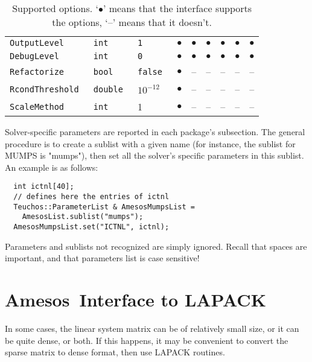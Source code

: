 \documentclass[11pt]{SANDreport}
\newcommand{\amesos}{{\sc Amesos}}
\begin{document}
\begin{sidewaystable}[tbhp]
\begin{tabular}{| p{5cm} | p{2cm} | p{2cm} | c | c | c
      | c | c | c |}
    \tt OutputLevel         & \tt int    & \tt 1      & $\bullet$ & $\bullet$ & $\bullet$ & $\bullet$ & $\bullet$  & $\bullet$\\
    \tt DebugLevel          & \tt int    & \tt 0      & $\bullet$ & $\bullet$ & $\bullet$ & $\bullet$ & $\bullet$ & $\bullet$ \\
    \tt Refactorize         & \tt bool   & \tt false  & $\bullet$ & -- & -- & -- & -- & -- \\
    \tt RcondThreshold      & \tt double & $10^{-12}$ & $\bullet$ & -- & -- & -- & -- &--\\
    \tt ScaleMethod         & \tt int    & 1          & $\bullet$ & -- & -- & -- & -- &--\\
    \hline
  \end{tabular}
  \caption{Supported options. `$\bullet$' means that the interface
    supports the options, `--' means that it doesn't.}
  \label{tab:options}
\end{sidewaystable}

Solver-specific parameters are reported in each package's subsection.
The general procedure is to create a sublist with a given name (for
instance, the sublist for MUMPS is "mumps"), then set all the
solver's specific parameters in this sublist. An example is as follows:
\begin{verbatim}
  int ictnl[40];
  // defines here the entries of ictnl
  Teuchos::ParameterList & AmesosMumpsList = 
    AmesosList.sublist("mumps");
  AmesosMumpsList.set("ICTNL", ictnl);
\end{verbatim}
Parameters and sublists not recognized are simply ignored. Recall that
spaces are important, and that parameters list is case sensitive!

\section{\amesos\ Interface to LAPACK}
\label{sec:lapack}

In some cases, the linear system matrix can be of relatively small size,
  or it can be quite dense, or both. If this happens, it may be convenient
  to convert the sparse matrix to dense format, then use LAPACK routines.
\end{document}
